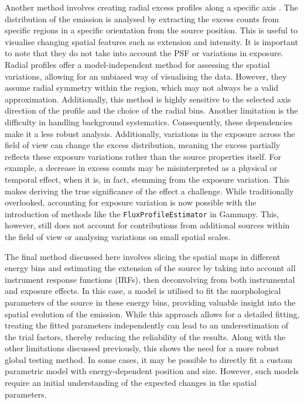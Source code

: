 \documentclass{aa}
\newcommand{\code}[1]{\texttt{#1}}
\begin{document}
Another method involves creating radial excess profiles along a specific axis \citep{HESS_2012,Edep_PWNe_HESS_2019,Edep_Principe_2020}. The distribution of the emission is analysed by extracting the excess counts from specific regions in a specific orientation from the source position. This is useful to visualise changing spatial features such as extension and intensity. 
It is important to note that they do not take into account the PSF or variations in exposure. 
Radial profiles offer a model-independent method for assessing the spatial variations, allowing for an unbiased way of visualising the data. However, they assume radial symmetry within the region, which may not always be a valid approximation. Additionally, this method is highly sensitive to the selected axis direction of the profile and the choice of the radial bins. Another limitation is the difficulty in handling background systematics. Consequently, these dependencies make it a less robust analysis. 
Additionally, variations in the exposure across the field of view can change the excess distribution, meaning the excess partially reflects these exposure variations rather than the source properties itself. For example, a decrease in excess counts may be misinterpreted as a physical or temporal effect, when it is, in fact, stemming from the exposure variation. This makes deriving the true significance of the effect a challenge. 
While traditionally overlooked, accounting for exposure variation is now possible with the introduction of methods like the \code{FluxProfileEstimator} in Gammapy. This, however, still does not account for contributions from additional sources within the field of view or analysing variations on small spatial scales.

The final method discussed here involves slicing the spatial maps in different energy bins and estimating the extension of the source \citep{Edep_Principe_2020} by taking into account all instrument response functions (IRFs), then deconvolving from both instrumental and exposure effects. In this case, a model is utilised to fit the morphological parameters of the source in these energy bins, providing valuable insight into the spatial evolution of the emission. While this approach allows for a detailed fitting, treating the fitted parameters independently can lead to an underestimation of the trial factors, thereby reducing the reliability of the results. Along with the other limitations discussed previously, this shows the need for a more robust global testing method. 
In some cases, it may be possible to directly fit a custom parametric model with energy-dependent position and size. However, such models require an initial understanding of the expected changes in the spatial parameters.
\end{document}
